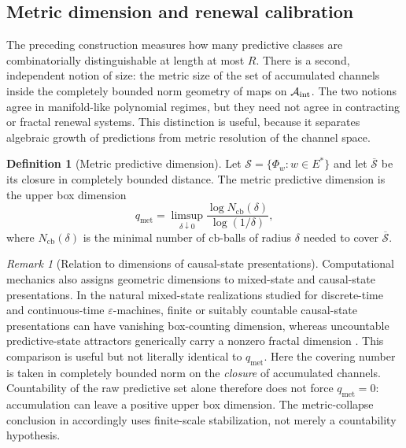 \documentclass[11pt]{article}
\theoremstyle{definition}
\newtheorem{definition}[theorem]{Definition}
\theoremstyle{remark}
\newtheorem{remark}[theorem]{Remark}
\newcommand{\A}{\mathcal{A}}
\newcommand{\qmet}{q_{\mathrm{met}}}
\newcommand{\cb}{\mathrm{cb}}
\begin{document}
\subsection{Metric dimension and renewal calibration}
\label{sec:metric}

The preceding construction measures how many predictive classes are
combinatorially distinguishable at length at most $R$.  There is a second,
independent notion of size: the metric size of the set of accumulated channels
inside the completely bounded norm geometry of maps on $\A_{\rm int}$.  The two
notions agree in manifold-like polynomial regimes, but they need not agree in
contracting or fractal renewal systems.  This distinction is useful, because it
separates algebraic growth of predictions from metric resolution of the channel
space.

\begin{definition}[Metric predictive dimension]
\label{def:qmet}
Let $\mathcal S=\{\Phi_w:w\in E^*\}$ and let $\overline{\mathcal S}$ be its closure in completely bounded distance.  The metric predictive dimension is the upper box dimension
\[
 \qmet=\limsup_{\delta\downarrow0}\frac{\log N_{\cb}(\delta)}{\log(1/\delta)},
\]
where $N_{\cb}(\delta)$ is the minimal number of $\cb$-balls of radius $\delta$ needed to cover $\overline{\mathcal S}$.
\end{definition}

\begin{remark}[Relation to dimensions of causal-state presentations]
\label{rem:qmet-computational-mechanics}
Computational mechanics also assigns geometric dimensions to mixed-state and
causal-state presentations.  In the natural mixed-state realizations studied for
discrete-time and continuous-time \(\varepsilon\)-machines, finite or suitably
countable causal-state presentations can have vanishing box-counting dimension,
whereas uncountable predictive-state attractors generically carry a nonzero
fractal dimension \cite{Marzen2018MWC,MarzenCrutchfield2017,
JurgensCrutchfield2021}.  This comparison is useful but not literally identical
to \(\qmet\).  Here the covering number is taken in completely bounded norm on
the \emph{closure} of accumulated channels.  Countability of the raw predictive
set alone therefore does not force \(\qmet=0\): accumulation can leave a
positive upper box dimension.  The metric-collapse conclusion in
 accordingly uses finite-scale stabilization, not merely a
countability hypothesis.
\end{remark}
\end{document}
